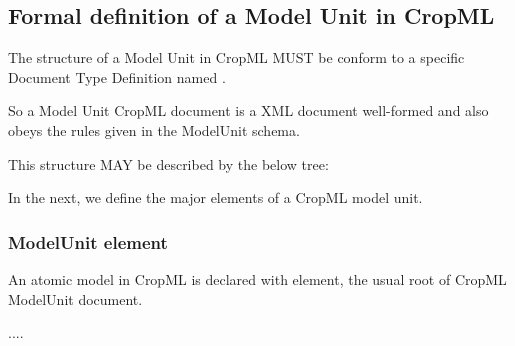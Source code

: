 \documentclass[letterpaper,10pt,english]{sphinxmanual}
\begin{document}
\subsection{Formal definition of a Model Unit in CropML}
\label{\detokenize{user/description:formal-definition-of-a-model-unit-in-cropml}}
\begin{DUlineblock}{0em}
\item[] The structure of a Model Unit in CropML MUST be conform to a specific Document Type Definition
named  .
\item[] So a Model Unit CropML document is a XML document well-formed and also obeys the rules given in the ModelUnit schema.
\item[] This structure MAY be described by the below tree:
\end{DUlineblock}

\noindent{}

\begin{DUlineblock}{0em}
\item[] In the next, we define the major elements of a CropML model unit.
\end{DUlineblock}


\subsubsection{ModelUnit element}
\label{\detokenize{user/description:modelunit-element}}
\begin{DUlineblock}{0em}
\item[] An atomic model in CropML is declared with  element,
the usual root of CropML ModelUnit document.
\end{DUlineblock}

%
\begin{sphinxVerbatim}[commandchars=\\\{\}]
    
        ....
\end{sphinxVerbatim}
\end{document}
